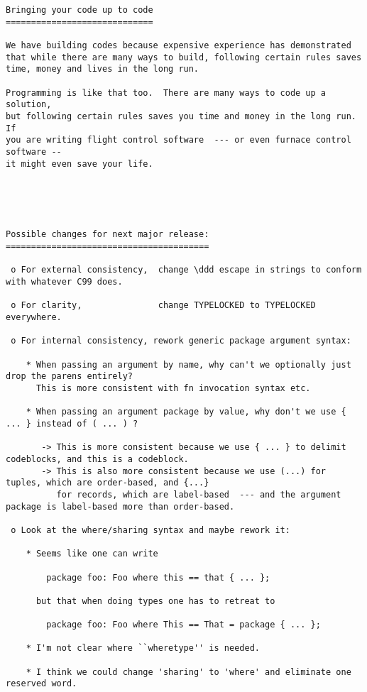 \begin{verbatim}
Bringing your code up to code 
============================= 

We have building codes because expensive experience has demonstrated 
that while there are many ways to build, following certain rules saves 
time, money and lives in the long run. 

Programming is like that too.  There are many ways to code up a solution, 
but following certain rules saves you time and money in the long run.  If 
you are writing flight control software  --- or even furnace control software -- 
it might even save your life. 





Possible changes for next major release: 
========================================

 o For external consistency,  change \ddd escape in strings to conform with whatever C99 does. 

 o For clarity,               change TYPELOCKED to TYPELOCKED everywhere. 

 o For internal consistency, rework generic package argument syntax: 

    * When passing an argument by name, why can't we optionally just drop the parens entirely? 
      This is more consistent with fn invocation syntax etc. 

    * When passing an argument package by value, why don't we use { ... } instead of ( ... ) ? 

       -> This is more consistent because we use { ... } to delimit codeblocks, and this is a codeblock. 
       -> This is also more consistent because we use (...) for tuples, which are order-based, and {...} 
          for records, which are label-based  --- and the argument package is label-based more than order-based. 

 o Look at the where/sharing syntax and maybe rework it: 

    * Seems like one can write 

        package foo: Foo where this == that { ... }; 

      but that when doing types one has to retreat to  

        package foo: Foo where This == That = package { ... };  
     
    * I'm not clear where ``wheretype'' is needed. 

    * I think we could change 'sharing' to 'where' and eliminate one reserved word. 







\end{verbatim}
